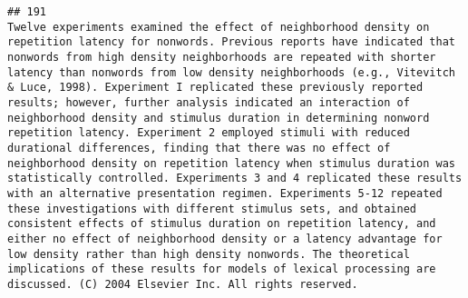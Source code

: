 \documentclass[
  english,
  man]{apa6}
\begin{document}
\begin{verbatim}
## 191                                                                                                                                                                                                                                                                                                                                                                                                                                                                                                                                                                                                                                                                                                                                                                                                                                                                                                                                                                                                                                                                                                                                                                                                                                                                                                                                                                                                                                           Twelve experiments examined the effect of neighborhood density on repetition latency for nonwords. Previous reports have indicated that nonwords from high density neighborhoods are repeated with shorter latency than nonwords from low density neighborhoods (e.g., Vitevitch & Luce, 1998). Experiment I replicated these previously reported results; however, further analysis indicated an interaction of neighborhood density and stimulus duration in determining nonword repetition latency. Experiment 2 employed stimuli with reduced durational differences, finding that there was no effect of neighborhood density on repetition latency when stimulus duration was statistically controlled. Experiments 3 and 4 replicated these results with an alternative presentation regimen. Experiments 5-12 repeated these investigations with different stimulus sets, and obtained consistent effects of stimulus duration on repetition latency, and either no effect of neighborhood density or a latency advantage for low density rather than high density nonwords. The theoretical implications of these results for models of lexical processing are discussed. (C) 2004 Elsevier Inc. All rights reserved.

\end{verbatim}
\end{document}
